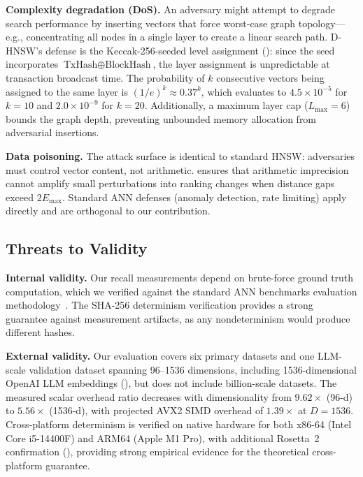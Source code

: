 \documentclass[10pt,journal]{IEEEtran}
\newcommand{\dhnsw}{\textsc{D-HNSW}}
\newcommand{\hnsw}{\textsc{HNSW}}
\begin{document}
\textbf{Complexity degradation (DoS).} An adversary might attempt to degrade search performance by inserting vectors that force worst-case graph topology---e.g., concentrating all nodes in a single layer to create a linear search path. \dhnsw{}'s defense is the Keccak-256-seeded level assignment (): since the seed incorporates $\text{TxHash} \oplus \text{BlockHash}$, the layer assignment is unpredictable at transaction broadcast time. The probability of $k$ consecutive vectors being assigned to the same layer is $(1/e)^k \approx 0.37^k$, which evaluates to $4.5 \times 10^{-5}$ for $k=10$ and $2.0 \times 10^{-9}$ for $k=20$. Additionally, a maximum layer cap ($L_{\max} = 6$) bounds the graph depth, preventing unbounded memory allocation from adversarial insertions.

\textbf{Data poisoning.} The attack surface is identical to standard \hnsw{}: adversaries must control vector content, not arithmetic.  ensures that arithmetic imprecision cannot amplify small perturbations into ranking changes when distance gaps exceed $2E_{\max}$. Standard ANN defenses (anomaly detection, rate limiting) apply directly and are orthogonal to our contribution.

\subsection{Threats to Validity}

\textbf{Internal validity.} Our recall measurements depend on brute-force ground truth computation, which we verified against the standard ANN benchmarks evaluation methodology~\cite{simhadri2022neurips}. The SHA-256 determinism verification provides a strong guarantee against measurement artifacts, as any nondeterminism would produce different hashes.

\textbf{External validity.} Our evaluation covers six primary datasets and one LLM-scale validation dataset spanning 96--1536 dimensions, including 1536-dimensional OpenAI LLM embeddings (), but does not include billion-scale datasets. The measured scalar overhead ratio decreases with dimensionality from $9.62\times$ (96-d) to $5.56\times$ (1536-d), with projected AVX2 SIMD overhead of $1.39\times$ at $D{=}1536$. Cross-platform determinism is verified on native hardware for both x86-64 (Intel Core i5-14400F) and ARM64 (Apple M1 Pro), with additional Rosetta~2 confirmation (), providing strong empirical evidence for the theoretical cross-platform guarantee.
\end{document}
